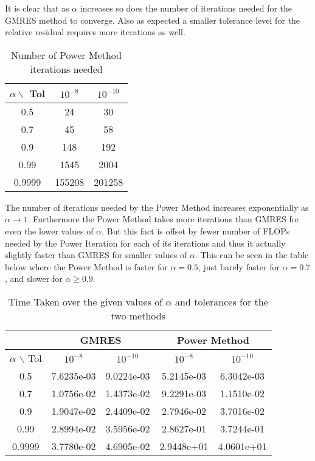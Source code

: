 \documentclass{article}
\begin{document}
\begin{enumerate}
	It is clear that as $\alpha$ increases so does the number of iterations needed for the GMRES method to converge. Also as expected a smaller tolerance level for the relative residual requires more iterations as well. 
	
	\begin{table}[h!]
		\centering
		\begin{tabular}{|c|c|c|}
			\hline
			$\alpha \backslash$ Tol & $10^{-8}$ & $10^{-10}$ \\
			\hline
			0.5 & 24 & 30\\
   			0.7 & 45 & 58\\
   			0.9 & 148 & 192\\
  			0.99 & 1545 & 2004\\
  			0.9999 & 155208 & 201258\\
  			\hline
		\end{tabular}
	\caption{Number of Power Method iterations needed}
	\end{table}
	
	The number of iterations needed by the Power Method increases exponentially as $\alpha \rightarrow 1$. Furthermore the Power Method takes more iterations than GMRES for even the lower values of $\alpha$. But this fact is offset by fewer number of FLOPs needed by the Power Iteration for each of its iterations and thus it actually slightly faster than GMRES for smaller values of $\alpha$. This can be seen in the table below where the Power Method is faster for $\alpha = 0.5$, just barely faster for $\alpha = 0.7$, and slower for $\alpha \geq 0.9$.
	
		\begin{table}[h!]
		\centering
	\begin{tabular}{ | c | c | c | c | c | }
		\hline
		& \multicolumn{2}{|c|}{GMRES} & \multicolumn{2}{|c|}{Power Method} \\ \hline
	$\alpha$ $ \backslash$ Tol & $10^{-8}$ & $10^{-10}$ & $10^{-8}$ & $10^{-10}$ \\ \hline
	0.5 & 7.6235e-03 & 9.0224e-03 & 5.2145e-03 & 6.3042e-03 \\ \hline
	0.7 & 1.0756e-02 & 1.4373e-02 & 9.2291e-03 & 1.1510e-02 \\ \hline
	0.9 & 1.9047e-02 & 2.4409e-02 & 2.7946e-02 & 3.7016e-02 \\ \hline
	0.99 & 2.8994e-02 & 3.5956e-02 & 2.8627e-01 & 3.7244e-01 \\ \hline
	0.9999 & 3.7780e-02 & 4.6905e-02 & 2.9448e+01 & 4.0601e+01 \\ \hline
		\end{tabular}
	\caption{Time Taken over the given values of $\alpha$ and tolerances for the two methods}
	\end{table}
	

\end{enumerate}
\end{document}
